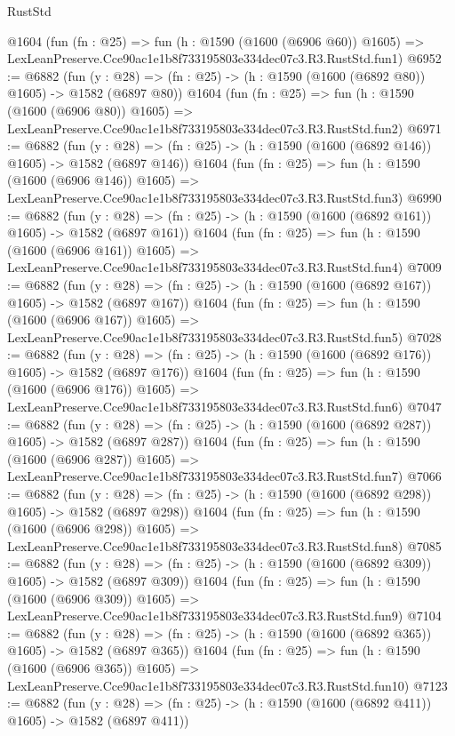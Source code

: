 \begin{lexlean}{RustStd}
\begin{coremodule}
    @1604
    (fun (fn : @25) =>
    fun (h : @1590 (@1600 (@6906 @60)) @1605) =>
    LexLeanPreserve.Cce90ac1e1b8f733195803e334dec07c3.R3.RustStd.fun1)
@6952 := @6882
    (fun (y : @28) => (fn : @25) -> (h : @1590 (@1600 (@6892 @80)) @1605) -> @1582 (@6897 @80))
    @1604
    (fun (fn : @25) =>
    fun (h : @1590 (@1600 (@6906 @80)) @1605) =>
    LexLeanPreserve.Cce90ac1e1b8f733195803e334dec07c3.R3.RustStd.fun2)
@6971 := @6882
    (fun (y : @28) => (fn : @25) -> (h : @1590 (@1600 (@6892 @146)) @1605) -> @1582 (@6897 @146))
    @1604
    (fun (fn : @25) =>
    fun (h : @1590 (@1600 (@6906 @146)) @1605) =>
    LexLeanPreserve.Cce90ac1e1b8f733195803e334dec07c3.R3.RustStd.fun3)
@6990 := @6882
    (fun (y : @28) => (fn : @25) -> (h : @1590 (@1600 (@6892 @161)) @1605) -> @1582 (@6897 @161))
    @1604
    (fun (fn : @25) =>
    fun (h : @1590 (@1600 (@6906 @161)) @1605) =>
    LexLeanPreserve.Cce90ac1e1b8f733195803e334dec07c3.R3.RustStd.fun4)
@7009 := @6882
    (fun (y : @28) => (fn : @25) -> (h : @1590 (@1600 (@6892 @167)) @1605) -> @1582 (@6897 @167))
    @1604
    (fun (fn : @25) =>
    fun (h : @1590 (@1600 (@6906 @167)) @1605) =>
    LexLeanPreserve.Cce90ac1e1b8f733195803e334dec07c3.R3.RustStd.fun5)
@7028 := @6882
    (fun (y : @28) => (fn : @25) -> (h : @1590 (@1600 (@6892 @176)) @1605) -> @1582 (@6897 @176))
    @1604
    (fun (fn : @25) =>
    fun (h : @1590 (@1600 (@6906 @176)) @1605) =>
    LexLeanPreserve.Cce90ac1e1b8f733195803e334dec07c3.R3.RustStd.fun6)
@7047 := @6882
    (fun (y : @28) => (fn : @25) -> (h : @1590 (@1600 (@6892 @287)) @1605) -> @1582 (@6897 @287))
    @1604
    (fun (fn : @25) =>
    fun (h : @1590 (@1600 (@6906 @287)) @1605) =>
    LexLeanPreserve.Cce90ac1e1b8f733195803e334dec07c3.R3.RustStd.fun7)
@7066 := @6882
    (fun (y : @28) => (fn : @25) -> (h : @1590 (@1600 (@6892 @298)) @1605) -> @1582 (@6897 @298))
    @1604
    (fun (fn : @25) =>
    fun (h : @1590 (@1600 (@6906 @298)) @1605) =>
    LexLeanPreserve.Cce90ac1e1b8f733195803e334dec07c3.R3.RustStd.fun8)
@7085 := @6882
    (fun (y : @28) => (fn : @25) -> (h : @1590 (@1600 (@6892 @309)) @1605) -> @1582 (@6897 @309))
    @1604
    (fun (fn : @25) =>
    fun (h : @1590 (@1600 (@6906 @309)) @1605) =>
    LexLeanPreserve.Cce90ac1e1b8f733195803e334dec07c3.R3.RustStd.fun9)
@7104 := @6882
    (fun (y : @28) => (fn : @25) -> (h : @1590 (@1600 (@6892 @365)) @1605) -> @1582 (@6897 @365))
    @1604
    (fun (fn : @25) =>
    fun (h : @1590 (@1600 (@6906 @365)) @1605) =>
    LexLeanPreserve.Cce90ac1e1b8f733195803e334dec07c3.R3.RustStd.fun10)
@7123 := @6882
    (fun (y : @28) => (fn : @25) -> (h : @1590 (@1600 (@6892 @411)) @1605) -> @1582 (@6897 @411))

\end{coremodule}
\end{lexlean}
